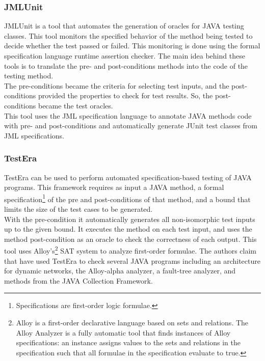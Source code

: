 \subsubsection{JMLUnit}
JMLUnit\cite{Cheon04thejml} is a tool that automates the generation of oracles for JAVA testing classes. This tool
monitors the specified behavior of the method being tested to decide whether the test passed or failed.
This monitoring is done using the formal specification language runtime assertion checker.
The main idea behind these tools is to translate the pre- and post-conditions methods into the code of the testing method.\\
The pre-conditions became the criteria for selecting test inputs, and the post-conditions provided the properties to check for
test results. So, the post-conditions became the test oracles.\\
This tool uses the \ac{JML}\cite{Burdy03anoverview} specification language to annotate JAVA methods code with pre- and post-conditions and
automatically generate JUnit test classes from \ac{JML} specifications.

\subsubsection{TestEra}
TestEra\cite{testera} can be used to perform automated specification-based testing of
JAVA programs. This framework requires as input a JAVA method, a formal specification\footnote{Specifications are first-order logic formulae.}
of the pre and post-conditions of that method, and a bound that limits the size of the test cases to be generated.\\
With the pre-condition it automatically generates all non-isomorphic test inputs up to the given bound.
It executes the method on each test input, and uses the method post-condition as an oracle to check the correctness of each output. This tool
uses Alloy's\footnote{Alloy is a first-order declarative language based on sets and relations. The Alloy Analyzer is a fully
automatic tool that finds instances of Alloy specifications: an instance
assigns values to the sets and relations in the specification such that
all formulae in the specification evaluate to true.} \ac{SAT} system to analyze first-order  formulae.
The authors claim that have used TestEra to check several JAVA programs including an architecture for
dynamic networks, the Alloy-alpha analyzer, a fault-tree analyzer, and methods from the JAVA Collection Framework.

